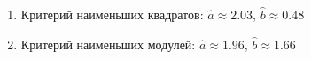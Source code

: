 \begin{enumerate}
\item Критерий наименьших квадратов:
$\hat{a}\approx 2.03$, $\hat{b}\approx 0.48$
\item Критерий наименьших модулей:
$\hat{a}\approx 1.96$, $\hat{b}\approx 1.66$
\end{enumerate}

